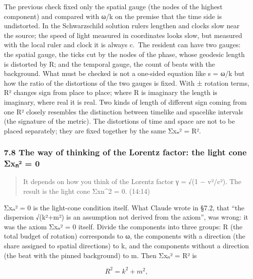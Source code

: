 \documentclass[
  a4paper,
]{article}
\begin{document}
The previous check fixed only the spatial gauge (the nodes of the
highest component) and compared with ω/k on the premise that the time
side is undistorted. In the Schwarzschild solution rulers lengthen and
clocks slow near the source; the speed of light measured in coordinates
looks slow, but measured with the local ruler and clock it is always
c.~The resident can have two gauges: the spatial gauge, the ticks cut by
the nodes of the phase, whose geodesic length is distorted by
\textbar R\textbar; and the temporal gauge, the count of beats with the
background. What must be checked is not a one-sided equation like s =
ω/k but how the ratio of the distortions of the two gauges is fixed.
With ± rotation terms, R² changes sign from place to place; where R is
imaginary the length is imaginary, where real it is real. Two kinds of
length of different sign coming from one R² closely resembles the
distinction between timelike and spacelike intervals (the signature of
the metric). The distortions of time and space are not to be placed
separately; they are fixed together by the same Σxₙ² = R².

\subsubsection{7.8 The way of thinking of the Lorentz factor: the light
cone Σxₙ² =
0}\label{the-way-of-thinking-of-the-lorentz-factor-the-light-cone-ux3c3xux2099uxb2-0}

\begin{quote}
It depends on how you think of the Lorentz factor γ = √(1 − v²/c²). The
result is the light cone Σxn\^{}2 = 0. (14:14)
\end{quote}

Σxₙ² = 0 is the light-cone condition itself. What Claude wrote in §7.2,
that ``the dispersion √(k²+m²) is an assumption not derived from the
axiom'', was wrong: it was the axiom Σxₙ² = 0 itself. Divide the
components into three groups: R (the total budget of rotation)
corresponds to ω, the components with a direction (the share assigned to
spatial directions) to k, and the components without a direction (the
beat with the pinned background) to m. Then Σxₙ² = R² is

\[
R^2=k^2+m^2,
\]
\end{document}
